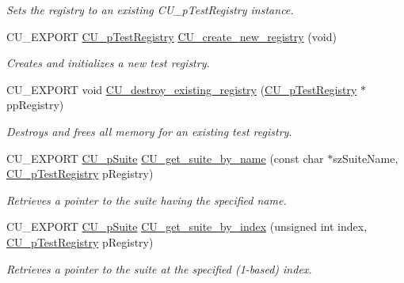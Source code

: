 \begin{DoxyCompactItemize}
\begin{DoxyCompactList}\small\item\em Sets the registry to an existing C\-U\-\_\-p\-Test\-Registry instance. \end{DoxyCompactList}\item 
C\-U\-\_\-\-E\-X\-P\-O\-R\-T \hyperlink{group__Framework_ga2a416821761e04581a70c41ae3587d5c}{C\-U\-\_\-p\-Test\-Registry} \hyperlink{group__Framework_ga5d2ce564b228122842f515cb4e5beda2}{C\-U\-\_\-create\-\_\-new\-\_\-registry} (void)
\begin{DoxyCompactList}\small\item\em Creates and initializes a new test registry. \end{DoxyCompactList}\item 
C\-U\-\_\-\-E\-X\-P\-O\-R\-T void \hyperlink{group__Framework_ga7c46b0ae888482411575c93d5d780b0d}{C\-U\-\_\-destroy\-\_\-existing\-\_\-registry} (\hyperlink{group__Framework_ga2a416821761e04581a70c41ae3587d5c}{C\-U\-\_\-p\-Test\-Registry} $\ast$pp\-Registry)
\begin{DoxyCompactList}\small\item\em Destroys and frees all memory for an existing test registry. \end{DoxyCompactList}\item 
C\-U\-\_\-\-E\-X\-P\-O\-R\-T \hyperlink{group__Framework_gaba832ae8b235f5e70d6a4ac9c3bb1219}{C\-U\-\_\-p\-Suite} \hyperlink{group__Framework_ga625d2e3767cdb663399a99cf88321e60}{C\-U\-\_\-get\-\_\-suite\-\_\-by\-\_\-name} (const char $\ast$sz\-Suite\-Name, \hyperlink{group__Framework_ga2a416821761e04581a70c41ae3587d5c}{C\-U\-\_\-p\-Test\-Registry} p\-Registry)
\begin{DoxyCompactList}\small\item\em Retrieves a pointer to the suite having the specified name. \end{DoxyCompactList}\item 
C\-U\-\_\-\-E\-X\-P\-O\-R\-T \hyperlink{group__Framework_gaba832ae8b235f5e70d6a4ac9c3bb1219}{C\-U\-\_\-p\-Suite} \hyperlink{group__Framework_ga75a31876ad11c8e5a6a5fadea7ef1051}{C\-U\-\_\-get\-\_\-suite\-\_\-by\-\_\-index} (unsigned int index, \hyperlink{group__Framework_ga2a416821761e04581a70c41ae3587d5c}{C\-U\-\_\-p\-Test\-Registry} p\-Registry)
\begin{DoxyCompactList}\small\item\em Retrieves a pointer to the suite at the specified (1-\/based) index. \end{DoxyCompactList}\item 

\end{DoxyCompactItemize}
